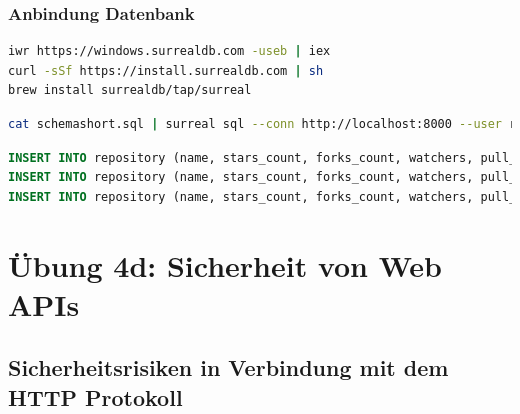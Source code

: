 \documentclass[notitlepage, hidelinks]{article}
\begin{document}
\subsubsection{Anbindung Datenbank} \label{anbindungdatenbank}


\begin{lstlisting}[language=bash,frame=single,caption=CLI Kommandos zur lokalen Installation der Datenbank für Windows\, Linux und macOS,label=dbinstall]
iwr https://windows.surrealdb.com -useb | iex
curl -sSf https://install.surrealdb.com | sh
brew install surrealdb/tap/surreal
\end{lstlisting}

\begin{lstlisting}[language=bash,frame=single,caption=CLI Kommando zur Übertragung der Daten aus der Datei in Listing \ref{sqldbone},label=dbsetup]
cat schemashort.sql | surreal sql --conn http://localhost:8000 --user root --pass root --ns base --db base
\end{lstlisting}


\begin{lstlisting}[language=SQL,frame=single,caption=Ausschnitt der sql Setupdatei,label=sqldbone]
INSERT INTO repository (name, stars_count, forks_count, watchers, pull_requests, primary_language, languages_used, commit_count, created_at, licence) VALUES ('react', 159266, 30464, 8497, 2911, lang:JavaScript, [lang:JavaScript, lang:HTML, lang:CSS], 5562, '2013-05-24T16:15:54Z', 'MIT License');
INSERT INTO repository (name, stars_count, forks_count, watchers, pull_requests, primary_language, languages_used, commit_count, created_at, licence) VALUES ('scikit-learn', 38327, 18225, 4968, 1701, lang:Python, [lang:Python, lang:Cython, lang:HTML, lang:CSS], 4085, '2010-01-10T09:58:52Z', 'BSD-3-Clause License');
INSERT INTO repository (name, stars_count, forks_count, watchers, pull_requests, primary_language, languages_used, commit_count, created_at, licence) VALUES ('angular', 68521, 24536, 6779, 2197, lang:TypeScript, [lang:TypeScript, lang:JavaScript, lang:HTML, lang:CSS], 4248, '2014-09-18T16:12:01Z', 'MIT License');
\end{lstlisting}



\newpage
\section{Übung 4d: Sicherheit von Web APIs}
\subsection{Sicherheitsrisiken in Verbindung mit dem HTTP Protokoll}
\end{document}
